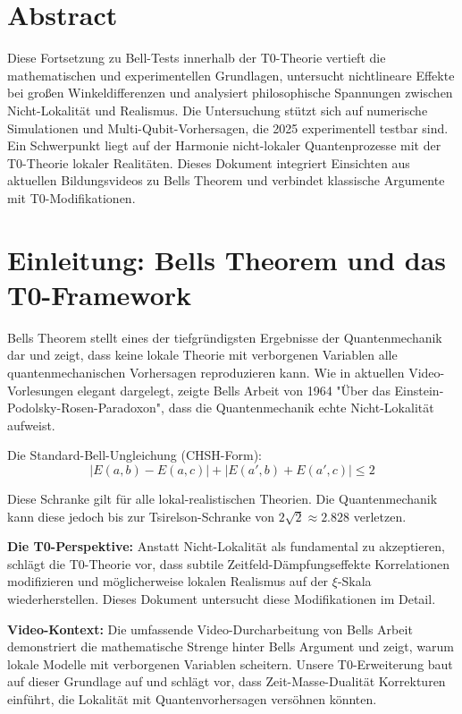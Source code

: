 \section*{Abstract}
Diese Fortsetzung zu Bell-Tests innerhalb der T0-Theorie vertieft die mathematischen und experimentellen Grundlagen, untersucht nichtlineare Effekte bei großen Winkeldifferenzen und analysiert philosophische Spannungen zwischen Nicht-Lokalität und Realismus. Die Untersuchung stützt sich auf numerische Simulationen und Multi-Qubit-Vorhersagen, die 2025 experimentell testbar sind. Ein Schwerpunkt liegt auf der Harmonie nicht-lokaler Quantenprozesse mit der T0-Theorie lokaler Realitäten. Dieses Dokument integriert Einsichten aus aktuellen Bildungsvideos zu Bells Theorem\cite{youtube_bell2025} und verbindet klassische Argumente mit T0-Modifikationen.



\section{Einleitung: Bells Theorem und das T0-Framework}
\label{sec:intro_extended}

Bells Theorem\cite{wiki_bell} stellt eines der tiefgründigsten Ergebnisse der Quantenmechanik dar und zeigt, dass keine lokale Theorie mit verborgenen Variablen alle quantenmechanischen Vorhersagen reproduzieren kann. Wie in aktuellen Video-Vorlesungen\cite{youtube_bell2025} elegant dargelegt, zeigte Bells Arbeit von 1964 "Über das Einstein-Podolsky-Rosen-Paradoxon", dass die Quantenmechanik echte Nicht-Lokalität aufweist.

Die Standard-Bell-Ungleichung (CHSH-Form):
\begin{equation}
|E(a,b) - E(a,c)| + |E(a',b) + E(a',c)| \leq 2
\label{eq:chsh_standard}
\end{equation}

Diese Schranke gilt für alle lokal-realistischen Theorien. Die Quantenmechanik kann diese jedoch bis zur Tsirelson-Schranke von $2\sqrt{2} \approx 2.828$ verletzen.

\textbf{Die T0-Perspektive:} Anstatt Nicht-Lokalität als fundamental zu akzeptieren, schlägt die T0-Theorie vor, dass subtile Zeitfeld-Dämpfungseffekte Korrelationen modifizieren und möglicherweise lokalen Realismus auf der $\xi$-Skala wiederherstellen. Dieses Dokument untersucht diese Modifikationen im Detail.

\textbf{Video-Kontext:} Die umfassende Video-Durcharbeitung von Bells Arbeit\cite{youtube_bell2025} demonstriert die mathematische Strenge hinter Bells Argument und zeigt, warum lokale Modelle mit verborgenen Variablen scheitern. Unsere T0-Erweiterung baut auf dieser Grundlage auf und schlägt vor, dass Zeit-Masse-Dualität Korrekturen einführt, die Lokalität mit Quantenvorhersagen versöhnen könnten.

